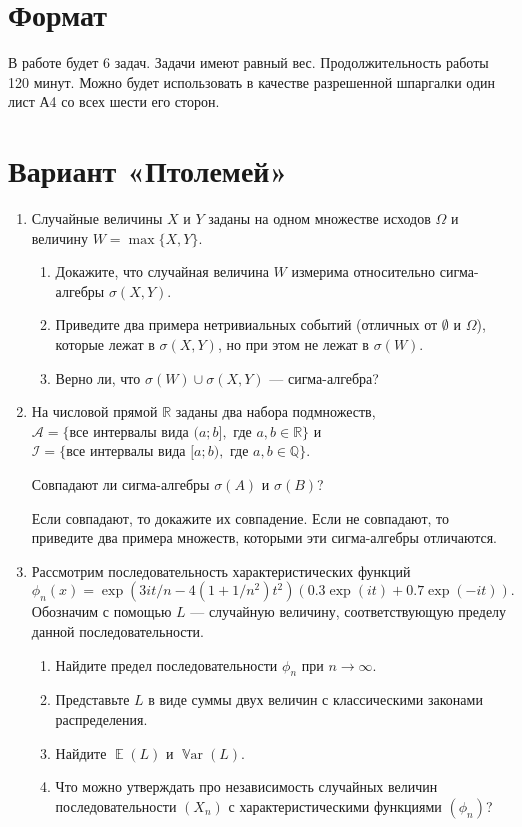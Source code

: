 \documentclass[12pt]{article}
\DeclareMathOperator{\Var}{\mathbb{V}ar}
\DeclareMathOperator{\E}{\mathbb{E}}
\newcommand \RR{\mathbb{R}}
\begin{document}
\section*{Формат}

В работе будет 6 задач. 
Задачи имеют равный вес. 
Продолжительность работы 120 минут. 
Можно будет использовать в качестве разрешенной шпаргалки один лист А4 со всех шести его сторон.

\section*{Вариант «Птолемей»}
\begin{enumerate}
    \item %
    Случайные величины $X$ и $Y$ заданы на одном множестве исходов $\Omega$ и величину $W = \max\{ X, Y \}$.
    \begin{enumerate}
        \item Докажите, что случайная величина $W$ измерима относительно сигма-алгебры $\sigma(X, Y)$.
        \item Приведите два примера нетривиальных событий (отличных от $\emptyset$ и $\Omega$), которые лежат в $\sigma(X, Y)$, но при этом не лежат в $\sigma(W)$.
        \item Верно ли, что $\sigma(W) \cup \sigma(X, Y)$ — сигма-алгебра?
    \end{enumerate}
    
    
    \item На числовой прямой $\RR$ заданы два набора подмножеств, $\mathcal{A} = \{\text{все интервалы вида } (a; b], \text{ где }a, b\in \RR \}$ и 
$\mathcal{I} = \{\text{все интервалы вида } [a; b), \text{ где }a, b\in \mathbb{Q} \}$.

Совпадают ли сигма-алгебры $\sigma(A)$ и $\sigma(B)$?

Если совпадают, то докажите их совпадение. 
Если не совпадают, то приведите два примера множеств, которыми эти сигма-алгебры отличаются. 

    \item Рассмотрим последовательность характеристических функций 
    \[
    \phi_n(x) = \exp(3it/n - 4(1 + 1/n^2)t^2)(0.3 \exp(it) + 0.7\exp(-it)).
    \]
    Обозначим с помощью $L$ — случайную величину, соответствующую пределу данной последовательности. 
    \begin{enumerate}
        \item Найдите предел последовательности $\phi_n$ при $n\to \infty$.
        \item Представьте $L$ в виде суммы двух величин с классическими законами распределения.
        \item Найдите $\E(L)$ и $\Var(L)$.
        \item Что можно утверждать про независимость случайных величин последовательности $(X_n)$ с характеристическими функциями $(\phi_n)$?
    \end{enumerate}


\end{enumerate}
\end{document}
